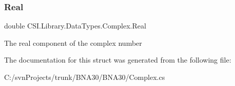 \mbox{\label{struct_c_s_i_1_1_library_1_1_data_types_1_1_complex_aa93303373159836c5e138d274f7c170b}} 
\subsubsection{\texorpdfstring{Real}{Real}}
{\footnotesize\ttfamily double C\+S\+I.\+Library.\+Data\+Types.\+Complex.\+Real}



The real component of the complex number 



The documentation for this struct was generated from the following file\+:\begin{DoxyCompactItemize}
\item 
C\+:/svn\+Projects/trunk/\+B\+N\+A30/\+B\+N\+A30/Complex.\+cs\end{DoxyCompactItemize}
